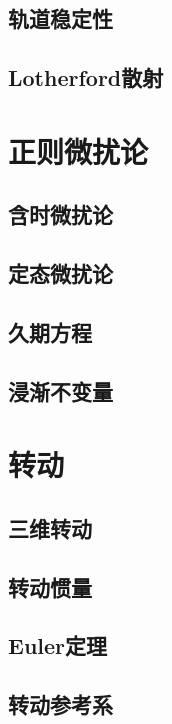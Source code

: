 \section{轨道稳定性}

\section{Lotherford散射}

\chapter{正则微扰论}
\label{sec:perturbation}
\section{含时微扰论}

\section{定态微扰论}

\section{久期方程}
\section{浸渐不变量}


\chapter{转动}
\label{sec:rotation}

\section{三维转动}

\section{转动惯量}

\section{Euler定理}

\section{转动参考系}

